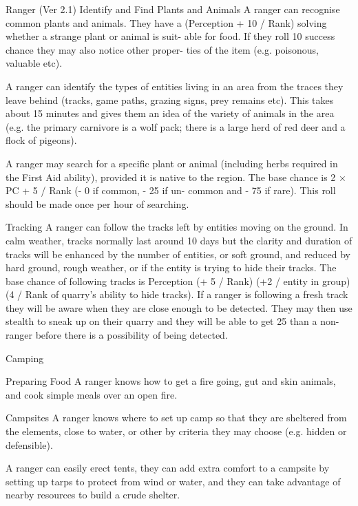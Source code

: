 \begin{Chapter}{Ranger (Ver 2.1)}
Identify  and  Find  Plants  and  Animals  A  ranger 
can  recognise  common  plants  and  animals.  They 
have  a  (Perception  +  10  /  Rank)%
solving  whether  a  strange  plant  or  animal  is  suit-
able  for  food.  If  they  roll  10%
success chance  they  may  also  notice  other  proper-
ties of the item (e.g. poisonous, valuable etc). 

A ranger can identify the types of entities living in 
an  area  from  the  traces  they  leave  behind  (tracks, 
game  paths,  grazing  signs, prey  remains  etc).  This 
takes  about  15  minutes  and  gives  them  an  idea  of 
the variety of animals in the area (e.g. the primary 
carnivore is a wolf pack; there is a large herd of red 
deer and a flock of pigeons). 

A ranger may search for a specific plant or animal 
(including  herbs  required  in  the  First  Aid  ability), 
provided it is native to the region. The base chance 
is  2  ×  PC  +  5  /  Rank  (-  0  if  common,  -  25  if  un-
common and - 75 if rare). This roll should be made 
once per hour of searching. 

Tracking  A  ranger  can  follow  the  tracks  left  by 
entities  moving  on  the  ground.  In  calm  weather, 
tracks normally last around 10 days but the clarity 
and  duration  of  tracks  will  be  enhanced  by  the 
number of entities, or soft ground, and reduced by 
hard  ground,  rough  weather,  or  if  the  entity  is 
trying  to  hide  their  tracks.  The  base  chance  of 
following  tracks  is  Perception  (+  5  /  Rank)  (+2  / 
entity in group) (4 / Rank of quarry’s ability to hide 
tracks).  If  a  ranger  is  following  a  fresh  track  they 
will  be  aware  when  they  are  close  enough  to  be 
detected. They may then use stealth to sneak up on 
their quarry and they will be able to get 25%
than  a  non-ranger  before  there  is  a  possibility  of 
being detected. 

Camping 

Preparing Food A ranger knows how to get a fire 
going, gut and skin animals, and cook simple meals 
over an open fire. 

Campsites  A  ranger  knows  where  to  set  up  camp 
so  that  they  are  sheltered  from  the  elements,  close 
to water, or other by criteria they may choose (e.g. 
hidden or defensible). 

A  ranger  can  easily  erect  tents, they  can  add  extra 
comfort to a campsite by setting up tarps to protect 
from wind or water, and they can take advantage of 
nearby resources to build a crude shelter. 


\end{Chapter}
